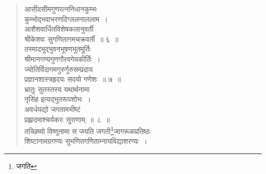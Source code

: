 \documentclass[11pt, openany]{book}
\begin{document}
\begin{quote}
    \qt
आसीदसीमगुणरत्ननिधानकुम्भः \\

\vspace{-5mm}
\hspace{0.5cm} कुम्भोद्भवाभरणदिग्ललनाललाम~। \\

\vspace{-5mm}
आशैशवार्धितविशेषकलानुवर्ती \\

\vspace{-5mm}
\hspace{0.5cm} श्रीकेशवः सुगणितागमचक्रवर्ती~॥ ६~॥\\

\vspace{-3mm}
तस्मादभूद्भुवनभूषणभूतमूर्तिः \\

\vspace{-5mm}
\hspace{0.5cm} श्रीमानगण्यगुणगौरवगेयकीर्तिः~। \\

\vspace{-5mm}
ज्योतिर्विदागमगुरुर्गुरुसम्प्रदाय\textendash \\

\vspace{-5mm}
\hspace{0.5cm} प्रज्ञानशास्त्रहृदयः सदयो गणेशः~॥ ७~॥\\

\vspace{-3mm}
भ्रातुः सुतस्तस्य यथार्थनामा \\

\vspace{-5mm}
\hspace{0.5cm} नृसिंह इत्यद्भुतरूपशोभः~। \\

\vspace{-5mm}
अवर्धयद्यो जगतामभीष्टं \\

\vspace{-5mm}
\hspace{0.5cm} प्रह्लादमाश्चर्यकरः सुराणाम्~॥~८~॥\\

\vspace{-3mm}
तच्छिष्यो विष्णुनामा स जयति जगती\renewcommand{\thefootnote}{*}\footnote{जगति}जागरूकप्रतिष्ठः \\

\vspace{-5mm}
\hspace{0.5cm} शिष्टानामग्रगण्यः सुभणितगणिताम्नायविद्याशरण्यः~। \\


\end{quote}
\end{document}
